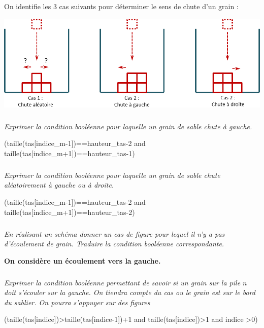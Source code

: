 \documentclass[10pt,fleqn]{article} %
\begin{document}
On identifie les 3 cas suivants pour déterminer le sens de chute d'un grain :
\begin{center}
\includegraphics[width=\linewidth]{images/sablier_03}
\end{center}
\fi

\subparagraph{}
\textit{Exprimer la condition booléenne pour laquelle un grain de sable chute à gauche.}
\ifprof
\begin{corrige}
\begin{python}
(taille(tas[indice_m-1])==hauteur_tas-2 and taille(tas[indice_m+1])==hauteur_tas-1)
\end{python}
\end{corrige}
\else
\fi

\subparagraph{}
\textit{Exprimer la condition booléenne pour laquelle un grain de sable chute aléatoirement à gauche ou à droite.}
\ifprof
\begin{corrige}
\begin{python}
(taille(tas[indice_m-1])==hauteur_tas-2 and taille(tas[indice_m+1])==hauteur_tas-2)
\end{python}
\end{corrige}
\else
\fi

\subparagraph{}
\textit{En réalisant un schéma donner un cas de figure pour lequel il n'y a pas d'écoulement de grain. Traduire la condition booléenne correspondante.}
\ifprof
\begin{corrige}

\end{corrige}
\else
\fi

\textbf{On considère un écoulement vers la gauche.}

\subparagraph{}
\textit{Exprimer la condition booléenne permettant de savoir si un grain sur la pile $n$ doit s'écouler sur la gauche. On tiendra compte du cas ou le grain est sur le bord du sablier. On pourra s'appuyer sur des figures}
\ifprof
\begin{corrige}
\begin{python}
(taille(tas[indice])>taille(tas[indice-1])+1 and taille(tas[indice])>1 and indice >0)
\end{python}
\end{corrige}
\else
\fi
\end{document}
